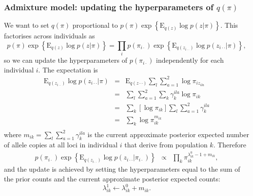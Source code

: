 \documentclass[12pt,a4paper,reqno]{article}
\newcommand{\E}{\text{E}{}}
\newcommand{\(}{\left(}
\newcommand{\)}{\right)}
\newcommand{\|}{\arrowvert}
\begin{document}
\subsubsection{Admixture model: updating the hyperparameters of $q(\pi)$} \label{q(pi)-update-admixture}
We want to set $q(\pi)$ proportional to $p(\pi)\exp\left\{\E_{q(z)} \log p(z|\pi)\right\}$. This factorises across individuals as
\begin{equation*}
  p(\pi)\exp\left\{\E_{q(z)} \log p(z|\pi)\right\} = \prod_{i} p(\pi_{i\cdot})\exp\left\{\E_{q(z_{i\cdot\cdot})} \log p(z_{i\cdot\cdot}|\pi)\right\},
\end{equation*}
so we can update the hyperparameters of $p(\pi_{i\cdot})$ independently for each individual $i$. The expectation is
\begin{eqnarray*}
  \E_{q(z_{i\cdot\cdot})} \log p(z_{i\cdot\cdot}|\pi)  &=& \E_{q(z\cdot\cdot)} \sum_{l} \sum_{a=1}^{2} \log \pi_{iz_{ila}} \\
  &=& \sum_{l} \sum_{a=1}^{2} \sum_{k} \gamma^{ila}_{k} \log \pi_{ik} \\
  &=& \sum_{k} \left[\log \pi_{ik}\right] \sum_{l} \sum_{a=1}^{2} \gamma^{ila}_{k} \\
  &=& \sum_{k} \log \pi_{ik}^{m_{ik}} \\
 \end{eqnarray*}
where $m_{ik} = \sum_{l} \sum_{a=1}^{2} \gamma^{ila}_{k}$ is the current approximate posterior expected number of allele copies at all loci in individual $i$ that derive from population $k$. Therefore
\begin{eqnarray*}
  p(\pi_{i\cdot})\exp\left\{\E_{q(z_{i\cdot\cdot})} \log p(z_{i\cdot\cdot}|\pi_{i\cdot})\right\}
&\propto& \prod_{k}\pi_{ik}^{\lambda^{0}_{ik} - 1 + m_{ik} },
\end{eqnarray*}
and the update is achieved by setting the hyperparameters equal to the sum of the prior counts and the current approximate posterior expected counts:
\begin{equation*}
  \lambda^{1}_{ik} \leftarrow \lambda^{0}_{ik} + m_{ik}.
\end{equation*}
\end{document}
